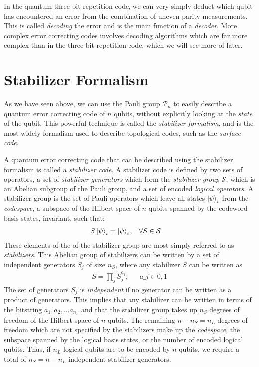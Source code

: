 In the quantum three-bit repetition code, we can very simply deduct which qubit has encountered an error from the combination of uneven parity measurements. This is called \emph{decoding} the error and is the main function of a \emph{decoder}. More complex error correcting codes involves decoding algorithms which are far more complex than in the three-bit repetition code, which we will see more of later.


\section{Stabilizer Formalism}

As we have seen above, we can use the Pauli group $\mathcal{P}_n$ to easily describe a quantum error correcting code of $n$ qubits, without explicitly looking at the \emph{state} of the qubit. This powerful technique is called the \emph{stabilizer formalism}, and is the most widely formalism used to describe topological codes, such as the \emph{surface code}. 

A quantum error correcting code that can be described using the stabilizer formalism is called a \emph{stabilizer code}. A stabilizer code is defined by two sets of operators, a set of \emph{stabilizer generators} which form the \emph{stabilizer group} $\mathcal{S}$, which is an Abelian subgroup of the Pauli group, and a set of encoded \emph{logical operators}. A stabilizer group is the set of Pauli operators which leave all states $\ket{\psi}_i$ from the \emph{codespace}, a subspace of the Hilbert space of $n$ qubits spanned by the codeword basis states, invariant, such that:
\begin{align}
  & S\ket{\psi}_i = \ket{\psi}_i, && \forall S \in \mathcal{S} &
\end{align}
These elements of the of the stabilizer group are most simply referred to as \emph{stabilizers}. This Abelian group of stabilizers can be written by a set of independent generators $S_j$ of size $n_S$, where any stabilizer $S$ can be written as
\begin{align}
 & S = \prod_{j}S_j^{a_j}, && a\_j \in {0, 1} &
\end{align}
The set of generators $S_j$ is \emph{independent} if no generator can be written as a product of generators. This implies that any stabilizer can be written in terms of the bitstring $a_1, a_2, ...a_{n_S}$ and that the stabilizer group takes up $n_S$ degrees of freedom of the Hilbert space of $n$ qubits. The remaining $n-n_S = n_L$ degrees of freedom which are not specified by the stabilizers make up the \emph{codespace}, the subspace spanned by the logical basis states, or the number of encoded logical qubits. Thus, if $n_L$ logical qubits are to be encoded by $n$ qubits, we require a total of $n_S = n-n_L$ independent stabilizer generators. 


